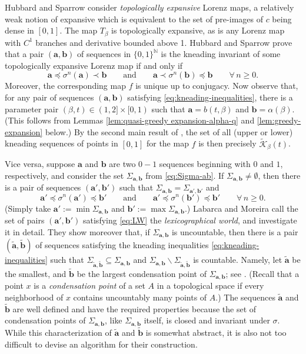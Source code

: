 \documentclass[11pt]{amsart}
\theoremstyle{definition}
\theoremstyle{remark}
\numberwithin{equation}{section}
\newcommand{\N}{\ensuremath{\mathbb{N}}}
\newcommand{\Kt}{\widetilde{\mathcal{K}}}
\renewcommand{\a}{ {\mathbf{a}}}
\renewcommand{\b}{ {\mathbf{b}}}
\newcommand{\z}{\mathbf{z}}
\newcommand{\al}{\alpha}
\newcommand{\lle}{\preccurlyeq}
\renewcommand{\a}{ \mathbf{a}}
\newcommand{\si}{\sigma}
\begin{document}
Hubbard and Sparrow \cite{Hubbard-Sparrow-1990} consider {\em topologically expansive} Lorenz maps, a relatively weak notion of expansive which is equivalent to the set of pre-images of $c$ being dense in $[0,1]$. The map $T_\beta$ is topologically expansive, as is any Lorenz map with $C^1$ branches and derivative bounded above 1. Hubbard and Sparrow  prove that a pair $(\a,\b)$ of sequences in $\{0,1\}^\N$ is the kneading invariant of some topologically expansive Lorenz map if and only if
\begin{equation} \label{eq:kneading-inequalities}
\a\lle \si^n(\a)\prec\b \qquad\mbox{and} \qquad \a\prec\si^n(\b)\lle \b \qquad \forall\,n\geq 0.
\end{equation}
Moreover, the corresponding map $f$ is unique up to conjugacy. Now observe that, for any pair of sequences $(\a,\b)$ satisfying \eqref{eq:kneading-inequalities}, there is a parameter pair $(\beta,t)\in(1,2]\times[0,1)$ such that $\a=b(t,\beta)$ and $\b=\al(\beta)$. (This follows from Lemmas \ref{lem:quasi-greedy expansion-alpha-q} and \ref{lem:greedy-expansion} below.) By the second main result of \cite{Hubbard-Sparrow-1990}, the set of all (upper or lower) kneading sequences of points in $[0,1]$ for the map $f$ is then precisely $\Kt_\beta(t)$.

Vice versa, suppose $\a$ and $\b$ are two $0-1$ sequences beginning with $0$ and $1$, respectively, and consider the set $\Sigma_{\a,\b}$ from \eqref{eq:Sigma-ab}.
If $\Sigma_{\a,\b}\neq\emptyset$, then there is a pair of sequences $(\a',\b')$ such that $\Sigma_{\a,\b}=\Sigma_{\a',\b'}$ and
\begin{equation} \label{eq:LW}
\a'\lle \si^n(\a')\lle\b' \qquad\mbox{and} \qquad \a'\lle\si^n(\b')\lle \b' \qquad \forall\,n\geq 0.
\end{equation}
(Simply take $\a':=\min\Sigma_{\a,\b}$ and $\b':=\max\Sigma_{\a,\b}$.) Labarca and Moreira \cite{Labarca-Moreira-2006} call the set of pairs $(\a',\b')$ satisfying \eqref{eq:LW} the {\em lexicographical world}, and investigate it in detail. They show moreover that, if $\Sigma_{\a,\b}$ is uncountable, then there is a pair $(\tilde{\a},\tilde{\b})$ of sequences satisfying the kneading inequalities \eqref{eq:kneading-inequalities} such that $\Sigma_{\tilde{\a},\tilde{\b}}\subseteq\Sigma_{\a,\b}$ and $\Sigma_{\a,\b}\backslash\Sigma_{\tilde{\a},\tilde{\b}}$ is countable. Namely, let $\tilde{\a}$ be the smallest, and $\tilde{\b}$ be the largest condensation point of $\Sigma_{\a,\b}$; see \cite[p.~689]{Labarca-Moreira-2006}. (Recall that a point $x$ is a {\em condensation point} of a set $A$ in a topological space if every neighborhood of $x$ contains uncountably many points of $A$.) The sequences $\tilde{\a}$ and $\tilde{\b}$ are well defined and have the required properties because the set of condensation points of $\Sigma_{\a,\b}$, like $\Sigma_{\a,\b}$ itself, is closed and invariant under $\si$. While this characterization of $\tilde{\a}$ and $\tilde{\b}$ is somewhat abstract, it is also not too difficult to devise an algorithm for their construction.
\end{document}
